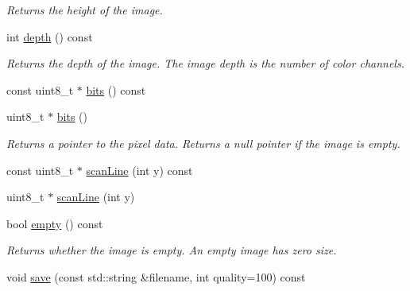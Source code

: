 \begin{DoxyCompactItemize}
\begin{DoxyCompactList}\small\item\em Returns the height of the image. \end{DoxyCompactList}\item 
\hypertarget{class_f_f_l_d_1_1_j_p_e_g_image_aed01a09f279c86cc1022d10f8a49204c}{int \hyperlink{class_f_f_l_d_1_1_j_p_e_g_image_aed01a09f279c86cc1022d10f8a49204c}{depth} () const }\label{class_f_f_l_d_1_1_j_p_e_g_image_aed01a09f279c86cc1022d10f8a49204c}

\begin{DoxyCompactList}\small\item\em Returns the depth of the image. The image depth is the number of color channels. \end{DoxyCompactList}\item 
const uint8\-\_\-t $\ast$ \hyperlink{class_f_f_l_d_1_1_j_p_e_g_image_a428a467149c63eac24859ab257667be0}{bits} () const 
\item 
\hypertarget{class_f_f_l_d_1_1_j_p_e_g_image_a06eab6917896ba5467e1e55974a2b52d}{uint8\-\_\-t $\ast$ \hyperlink{class_f_f_l_d_1_1_j_p_e_g_image_a06eab6917896ba5467e1e55974a2b52d}{bits} ()}\label{class_f_f_l_d_1_1_j_p_e_g_image_a06eab6917896ba5467e1e55974a2b52d}

\begin{DoxyCompactList}\small\item\em Returns a pointer to the pixel data. Returns a null pointer if the image is empty. \end{DoxyCompactList}\item 
const uint8\-\_\-t $\ast$ \hyperlink{class_f_f_l_d_1_1_j_p_e_g_image_a2c6033407c9724c25b9dd3ba8052d4e6}{scan\-Line} (int y) const 
\item 
uint8\-\_\-t $\ast$ \hyperlink{class_f_f_l_d_1_1_j_p_e_g_image_a6451758eb67c634c41d9a2a99eefc8c9}{scan\-Line} (int y)
\item 
\hypertarget{class_f_f_l_d_1_1_j_p_e_g_image_a05e9c73c5a6721ad9410b696cad718b5}{bool \hyperlink{class_f_f_l_d_1_1_j_p_e_g_image_a05e9c73c5a6721ad9410b696cad718b5}{empty} () const }\label{class_f_f_l_d_1_1_j_p_e_g_image_a05e9c73c5a6721ad9410b696cad718b5}

\begin{DoxyCompactList}\small\item\em Returns whether the image is empty. An empty image has zero size. \end{DoxyCompactList}\item 
\hypertarget{class_f_f_l_d_1_1_j_p_e_g_image_a2104c2a7ced8d3267712034cd4bb8556}{void \hyperlink{class_f_f_l_d_1_1_j_p_e_g_image_a2104c2a7ced8d3267712034cd4bb8556}{save} (const std\-::string \&filename, int quality=100) const }\label{class_f_f_l_d_1_1_j_p_e_g_image_a2104c2a7ced8d3267712034cd4bb8556}


\end{DoxyCompactItemize}
